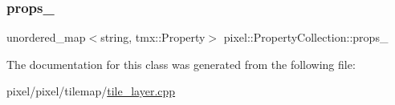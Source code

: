\subsubsection{\texorpdfstring{props\+\_\+}{props\_}}
{\footnotesize\ttfamily unordered\+\_\+map$<$string, tmx\+::\+Property$>$ pixel\+::\+Property\+Collection\+::props\+\_\+\hspace{0.3cm}{\ttfamily [private]}}



The documentation for this class was generated from the following file\+:\begin{DoxyCompactItemize}
\item 
pixel/pixel/tilemap/\hyperlink{tile__layer_8cpp}{tile\+\_\+layer.\+cpp}\end{DoxyCompactItemize}
